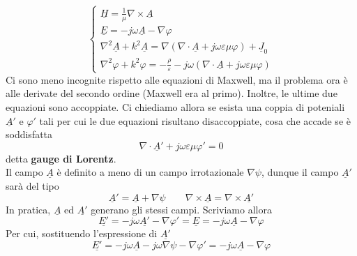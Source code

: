 \documentclass{book}
\begin{document}
            \begin{equation}
                \begin{cases}
                    \underline{H} = \frac{1}{\mu} \nabla \times \underline{A} \\
                    \underline{E} = -j \omega \underline{A}-\nabla \varphi \\
                    \nabla ^{2} \underline{A}+k^{2}\underline{A}= \nabla(\nabla \cdot \underline{A}+j \omega \varepsilon \mu \varphi)+\underline{J}_{0} \\
                    \displaystyle \nabla ^{2} \varphi +k^{2} \varphi = -\frac{\rho}{\varepsilon}-j \omega ( \nabla \cdot \underline{A}+j \omega \varepsilon \mu \varphi)
                \end{cases}
            \end{equation}
            Ci sono meno incognite rispetto alle equazioni di Maxwell, ma il problema ora è alle derivate del secondo ordine (Maxwell era al primo). Inoltre, le ultime due equazioni sono accoppiate.
            Ci chiediamo allora se esista una coppia di poteniali $\underline{A} '$ e $\varphi '$ tali per cui le due equazioni risultano disaccoppiate, cosa che accade se è soddisfatta
            \begin{equation}
                \nabla \cdot \underline{A} ' +j \omega \varepsilon \mu \varphi ' = 0
            \end{equation}
            detta \textbf{gauge di Lorentz}. \\
            Il campo $\underline{A}$ è definito a meno di un campo irrotazionale $\nabla \psi$, dunque il campo $\underline{A}'$ sarà del tipo
            \begin{equation}
                \underline{A}' = \underline{A}+\nabla \psi \qquad \nabla \times \underline{A} = \nabla \times \underline{A'}
            \end{equation}
            In pratica, $\underline{A}$ ed $\underline{A'}$ generano gli stessi campi. Scriviamo allora 
            \begin{equation}
                \underline{E'}= -j \omega \underline{A'} - \nabla \varphi' = \underline{E}= -j \omega \underline{A} - \nabla \varphi
            \end{equation}
            Per cui, sostituendo l'espressione di $\underline{A'}$
            \begin{equation}
                \underline{E'} = -j \omega \underline{A}-j \omega \nabla \psi - \nabla \varphi ' = -j \omega \underline{A}-\nabla \varphi
            \end{equation}
\end{document}
